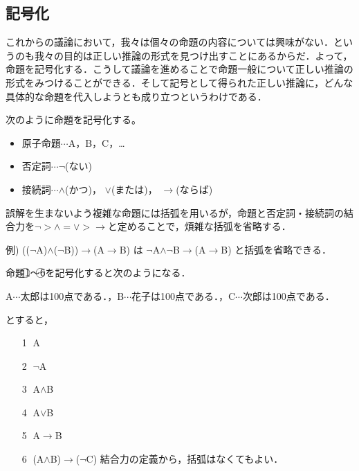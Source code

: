 \documentclass[10pt,b5paper,papersize,dvipdfmx]{jsbook}
\begin{document}
\subsection{記号化}
これからの議論において，我々は個々の命題の内容については興味がない．というのも我々の目的は正しい推論の形式を見つけ出すことにあるからだ．よって，命題を記号化する．こうして議論を進めることで命題一般について正しい推論の形式をみつけることができる．そして記号として得られた正しい推論に，どんな具体的な命題を代入しようとも成り立つというわけである．\par
次のように命題を記号化する。
\begin{itemize}
\item 原子命題$\cdots$A，B，C，\dots
\item 否定詞$\cdots$$\lnot$(ない)
\item 接続詞$\cdots$$\land$(かつ)， $\lor$(または)， $\to$(ならば)
\end{itemize}
誤解を生まないよう複雑な命題には括弧を用いるが，命題と否定詞・接続詞の結合力を$\lnot>\land=\lor>\to$と定めることで，煩雑な括弧を省略する．\par
例) (($\lnot$A)$\land$($\lnot$B))$\to$(A$\to$B) は $\lnot$A$\land$$\lnot$B$\to$(A$\to$B) と括弧を省略できる．\par
命題\textcircled{\scriptsize 1}～\textcircled{\scriptsize 6}を記号化すると次のようになる．\par
A$\cdots$太郎は100点である．，B$\cdots$花子は100点である．，C$\cdots$次郎は100点である．\par
とすると，
\begin{itemize}
\item[\textcircled{\scriptsize 1}]A
\item[\textcircled{\scriptsize 2}]$\lnot$A
\item[\textcircled{\scriptsize 3}]A$\land$B
\item[\textcircled{\scriptsize 4}]A$\lor$B
\item[\textcircled{\scriptsize 5}]A$\to$B
\item[\textcircled{\scriptsize 6}](A$\land$B)$\to$($\lnot$C) 結合力の定義から，括弧はなくてもよい．
\end{itemize}
\end{document}
